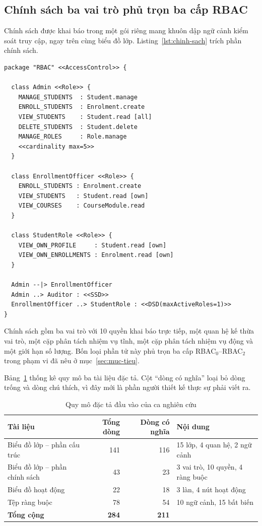 \subsection{Chính sách ba vai trò phủ trọn ba cấp RBAC}

Chính sách được khai báo trong một gói riêng mang khuôn dập ngữ cảnh kiểm soát truy cập, ngay trên cùng biểu đồ lớp. Listing~\ref{lst:chinh-sach} trích phần chính sách.

\begin{lstlisting}[language=PlantUML,caption={Chính sách kiểm soát truy cập của CourseMan (trích)},label={lst:chinh-sach}]
package "RBAC" <<AccessControl>> {

  class Admin <<Role>> {
    MANAGE_STUDENTS  : Student.manage
    ENROLL_STUDENTS  : Enrolment.create
    VIEW_STUDENTS    : Student.read [all]
    DELETE_STUDENTS  : Student.delete
    MANAGE_ROLES     : Role.manage
    <<cardinality max=5>>
  }

  class EnrollmentOfficer <<Role>> {
    ENROLL_STUDENTS : Enrolment.create
    VIEW_STUDENTS   : Student.read [own]
    VIEW_COURSES    : CourseModule.read
  }

  class StudentRole <<Role>> {
    VIEW_OWN_PROFILE     : Student.read [own]
    VIEW_OWN_ENROLLMENTS : Enrolment.read [own]
  }

  Admin --|> EnrollmentOfficer
  Admin ..> Auditor : <<SSD>>
  EnrollmentOfficer ..> StudentRole : <<DSD(maxActiveRoles=1)>>
}
\end{lstlisting}

Chính sách gồm ba vai trò với 10 quyền khai báo trực tiếp, một quan hệ kế thừa vai trò, một cặp phân tách nhiệm vụ tĩnh, một cặp phân tách nhiệm vụ động và một giới hạn số lượng. Bốn loại phần tử này phủ trọn ba cấp RBAC$_0$--RBAC$_2$ trong phạm vi đã nêu ở mục~\ref{sec:muc-tieu}.

Bảng~\ref{tab:dac-ta-dau-vao} thống kê quy mô ba tài liệu đặc tả. Cột ``dòng có nghĩa'' loại bỏ dòng trống và dòng chú thích, vì đây mới là phần người thiết kế thực sự phải viết ra.

\begin{table}[htbp]
\centering
\caption{Quy mô đặc tả đầu vào của ca nghiên cứu}
\label{tab:dac-ta-dau-vao}
\small
\begin{tabularx}{\textwidth}{@{}Xrrl@{}}
\toprule
\textbf{Tài liệu} & \textbf{Tổng dòng} & \textbf{Dòng có nghĩa} & \textbf{Nội dung} \\
\midrule
Biểu đồ lớp -- phần cấu trúc & 141 & 116 & 15 lớp, 4 quan hệ, 2 ngữ cảnh \\
Biểu đồ lớp -- phần chính sách & 43 & 23 & 3 vai trò, 10 quyền, 4 ràng buộc \\
Biểu đồ hoạt động & 22 & 18 & 3 làn, 4 nút hoạt động \\
Tệp ràng buộc & 78 & 54 & 10 ngữ cảnh, 15 bất biến \\
\midrule
\textbf{Tổng cộng} & \textbf{284} & \textbf{211} & \\
\bottomrule
\end{tabularx}
\end{table}


